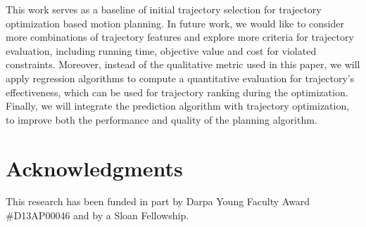 \documentclass[letterpaper, 10 pt, conference]{ieeeconf}  %
\begin{document}
This work serves as a baseline of initial trajectory selection for trajectory optimization based motion planning. In future work, we would like to consider more combinations of trajectory features and explore more criteria for trajectory evaluation, including running time, objective value and cost for violated constraints. Moreover, instead of the qualitative metric used in this paper, we will apply regression algorithms to compute a quantitative evaluation for trajectory's effectiveness, which can be used for trajectory ranking during the optimization.
Finally, we will integrate the prediction algorithm with trajectory optimization, to improve both the performance and quality of the planning algorithm.


\section*{Acknowledgments}
This research has been funded in part by Darpa Young Faculty Award \#D13AP00046 and by a Sloan Fellowship.




\end{document}
